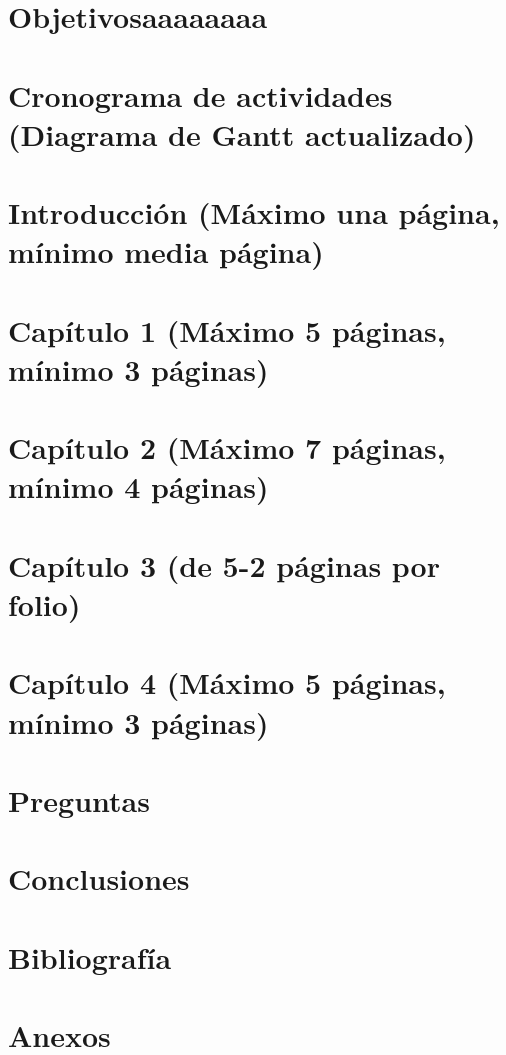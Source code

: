 \documentclass[12pt]{article}
\begin{document}
	
	\tableofcontents
	\newpage
	
	\section{Objetivosaaaaaaaa}
	\section{Cronograma de actividades (Diagrama de Gantt actualizado)}
	\section{Introducción (Máximo una página, mínimo media página)}
	\section{Capítulo 1 (Máximo 5 páginas, mínimo 3 páginas)}
	\section{Capítulo 2 (Máximo 7 páginas, mínimo 4 páginas)}
	\section{Capítulo 3 (de 5-2 páginas por folio)}
	\section{Capítulo 4 (Máximo 5 páginas, mínimo 3 páginas)}
	\section{Preguntas}
	\section{Conclusiones}
	\section{Bibliografía}
	\section{Anexos}
	
\end{document}
